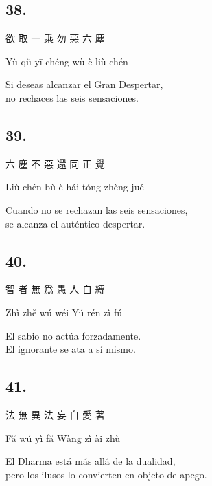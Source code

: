 \documentclass[
  a5paperpaper,
]{article}
\begin{document}
\begin{verseblock}

\hypertarget{section-112}{%
\subsection{38.}\label{section-112}}

欲 取 一 乘 勿 惡 六 塵

Yù qŭ yī chéng wù è liù chén

Si deseas alcanzar el Gran Despertar,\\
no rechaces las seis sensaciones.

\end{verseblock}

\begin{verseblock}

\hypertarget{section-113}{%
\subsection{39.}\label{section-113}}

六 塵 不 惡 還 同 正 覺

Liù chén bù è hái tóng zhèng jué

Cuando no se rechazan las seis sensaciones,\\
se alcanza el auténtico despertar.

\end{verseblock}

\begin{verseblock}

\hypertarget{section-114}{%
\subsection{40.}\label{section-114}}

智 者 無 爲 愚 人 自 縛

Zhì zhě wú wéi Yú rén zì fú

El sabio no actúa forzadamente.\\
El ignorante se ata a sí mismo.

\end{verseblock}

\begin{verseblock}

\hypertarget{section-115}{%
\subsection{41.}\label{section-115}}

法 無 異 法 妄 自 愛 著

Fă wú yì fă Wàng zì ài zhù

El Dharma está más allá de la dualidad,\\
pero los ilusos lo convierten en objeto de apego.

\end{verseblock}
\end{document}
